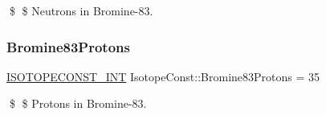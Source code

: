 \$ \$ Neutrons in Bromine-\/83. \mbox{\label{group___isotope_const-_bromine-_br83_gaaad9b32f40281f8c125d2dd9970029ee}} 
\subsubsection{\texorpdfstring{Bromine83\+Protons}{Bromine83Protons}}
{\footnotesize\ttfamily \mbox{\hyperlink{group___isotope_const-_macros_ga5f18360b3e99483a35c32d789e62621c}{I\+S\+O\+T\+O\+P\+E\+C\+O\+N\+S\+T\+\_\+\+I\+NT}} Isotope\+Const\+::\+Bromine83\+Protons = 35}

\$ \$ Protons in Bromine-\/83. 